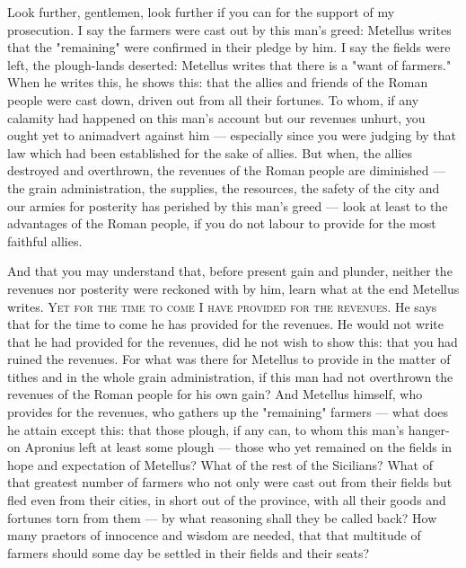  Look further, gentlemen, look further if you can for the support of my prosecution. I say the farmers were cast out by this man's greed: Metellus writes that the "remaining" were confirmed in their pledge by him. I say the fields were left, the plough-lands deserted: Metellus writes that there is a "want of farmers." When he writes this, he shows this: that the allies and friends of the Roman people were cast down, driven out from all their fortunes. To whom, if any calamity had happened on this man's account but our revenues unhurt, you ought yet to animadvert against him --- especially since you were judging by that law which had been established for the sake of allies. But when, the allies destroyed and overthrown, the revenues of the Roman people are diminished --- the grain administration, the supplies, the resources, the safety of the city and our armies for posterity has perished by this man's greed --- look at least to the advantages of the Roman people, if you do not labour to provide for the most faithful allies.

 And that you may understand that, before present gain and plunder, neither the revenues nor posterity were reckoned with by him, learn what at the end Metellus writes. \textsc{Yet for the time to come I have provided for the revenues}. He says that for the time to come he has provided for the revenues. He would not write that he had provided for the revenues, did he not wish to show this: that you had ruined the revenues. For what was there for Metellus to provide in the matter of tithes and in the whole grain administration, if this man had not overthrown the revenues of the Roman people for his own gain? And Metellus himself, who provides for the revenues, who gathers up the "remaining" farmers --- what does he attain except this: that those plough, if any can, to whom this man's hanger-on Apronius left at least some plough --- those who yet remained on the fields in hope and expectation of Metellus? What of the rest of the Sicilians? What of that greatest number of farmers who not only were cast out from their fields but fled even from their cities, in short out of the province, with all their goods and fortunes torn from them --- by what reasoning shall they be called back? How many praetors of innocence and wisdom are needed, that that multitude of farmers should some day be settled in their fields and their seats?

